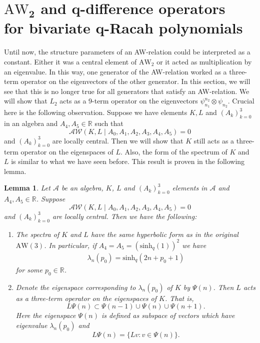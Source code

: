 \documentclass[pdftex]{sigma}
\numberwithin{equation}{section}
\newtheorem{Lemma}[Theorem]{Lemma}
\newcommand{\RR}{\mathbb{R}}
\newcommand{\A}{{\mathscr A}}
\newcommand{\aw}{\mathrm{AW}\!\left(3\right)}
\newcommand{\AW}[1]{\mathrm{AW}_{#1}}
\newcommand{\awr}{\mathscr{A}\!\!\mathscr{W}}
\newcommand{\shq}{\mathrm{sinh}_q}
\begin{document}
\section[AW\_2 and q-difference operators for bivariate q-Racah polynomials]{$\boldsymbol{\AW{2}}$ and $\boldsymbol{q}$-difference operators\\ for bivariate $\boldsymbol{q}$-Racah polynomials}\label{sec:qdif}

Until now, the structure parameters of an AW-relation could be interpreted as a constant. Either it was a central element of $\AW{2}$ or it acted as multiplication by an eigenvalue. In this way, one generator of the AW-relation worked as a three-term operator on the eigenvectors of the other generator. In this section, we will see that this is no longer true for all generators that satisfy an AW-relation. We will show that $L_2$ acts as a 9-term operator on the eigenvectors $\psi_{n_1}^{n_2}\otimes \psi_{n_2}$. Crucial here is the following observation. Suppose we have elements $K,L$ and $(A_k)_{k=0}^3$ in an algebra and $A_4,A_5\in\RR$ such that
\[
\awr(K,L\mid A_0,A_1,A_2,A_3,A_4,A_5)=0
\]
and $(A_k)_{k=0}^3$ are locally central. Then we will show that $K$ still acts as a three-term operator on the eigenspaces of $L$. Also, the form of the spectrum of $K$ and $L$ is similar to what we have seen before. This result is proven in the following lemma.
\begin{Lemma}\label{lem:threetermeigenspace}
	Let $\A$ be an algebra, $K$, $L$ and $(A_k)_{k=0}^3$ elements in $\A$ and $A_4,A_5\in\RR$. Suppose
	\[
	\awr(K,L\mid A_0,A_1,A_2,A_3,A_4,A_5)=0
	\]
	and $(A_k)_{k=0}^3$ are locally central. Then we have the following:
\begin{enumerate}\itemsep=0pt
		\item[$(i)$] The spectra of $K$ and $L$ have the same hyperbolic form as in the original $\aw$. In particular, if $A_4=A_5=(\shq(1))^2$ we have
		\begin{gather*}
			\lambda_n(p_0)=\shq(2n+p_0+1)%
		\end{gather*}
		for some $p_0\in\RR$.
		\item[$(ii)$] Denote the eigenspace corresponding to $\lambda_n(p_0)$ of $K$ by $\Psi(n)$. Then $L$ acts as a three-term operator on the eigenspaces of $K$. That is,
		\[
		L \Psi(n) \subset \Psi(n-1)\cup \Psi(n)\cup\Psi(n+1).
		\]
		Here the eigenspace $\Psi(n)$ is defined as subspace of vectors which have eigenvalue $\lambda_n(p_0)$ and
		\[
		L \Psi(n)=\{ Lv\colon v\in\Psi(n)\}.
		\]
	\end{enumerate}
\end{Lemma}
\end{document}
